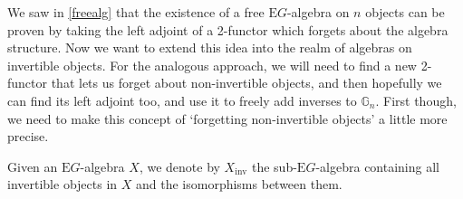 \documentclass{amsart} %
\begin{document}
We saw in \cref{freealg} that the existence of a free $\mathrm{E}G$-algebra on $n$ objects can be proven by taking the left adjoint of a 2-functor which forgets about the algebra structure. Now we want to extend this idea into the realm of algebras on invertible objects. For the analogous approach, we will need to find a new 2-functor that lets us forget about non-invertible objects, and then hopefully we can find its left adjoint too, and use it to freely add inverses to $\mathbb{G}_n$. First though, we need to make this concept of `forgetting non-invertible objects' a little more precise.

\begin{defn} Given an $\mathrm{E}G$-algebra $X$, we denote by $X_{\mathrm{inv}}$ the sub-$\mathrm{E}G$-algebra containing all invertible objects in $X$ and the isomorphisms between them. \end{defn}
\end{document}
